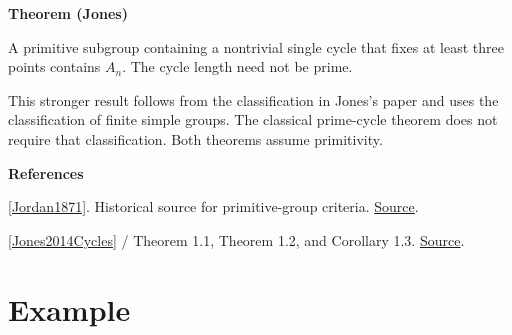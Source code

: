 \documentclass[11pt,a4paper,oneside,openany]{book}
\newenvironment{sources}{\par\smallskip\begingroup\footnotesize\color{atlasgray}\leftskip=10pt\setlength{\parskip}{2pt}}{\par\endgroup\smallskip}
\begin{document}
\begin{atlasblock}[standard]
\textbf{\sffamily Theorem (Jones)}\par\smallskip
\color{black} A primitive subgroup containing a nontrivial single cycle that fixes at least three points contains \(A_n\). The cycle length need not be prime.\par
\end{atlasblock}\color{black}
\color{black} This stronger result follows from the classification in Jones's paper and uses the classification of finite simple groups. The classical prime-cycle theorem does not require that classification. Both theorems assume primitivity.\par
\begin{sources}
\textbf{References}\par\smallskip
\noindent\hyperlink{ref:Jordan1871}{[Jordan1871]}. Historical source for primitive-group criteria. \href{https://www.numdam.org/item/JMPA_1871_2_16__383_0/}{Source}.\par
\noindent\hyperlink{ref:Jones2014Cycles}{[Jones2014Cycles]} / Theorem 1.1, Theorem 1.2, and Corollary 1.3.  \href{https://doi.org/10.1017/S000497271300049X}{Source}.\par
\end{sources}\color{black}
\section{Example}
\end{document}
